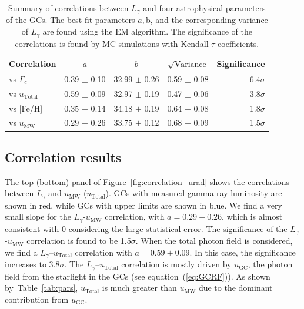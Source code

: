 \documentclass[doublespace,nopageskip]{VTthesis} %
\begin{document}
\begin{table}[htb]
\centering
\caption{Summary of correlations between $L_\gamma$ and four astrophysical parameters of the GCs. The best-fit parameters $a, $b, and the corresponding variance of $L_\gamma$ are found using the EM algorithm. The significance of the correlations is found by MC simulations with Kendall $\tau$ coefficients.}
\label{tab:correlation}
\begin{tabular}{lcccr}
\hline
 Correlation & $a$ & $b$ & $\sqrt{\text{Variance}}$ & Significance\\
\hline
vs $\Gamma_c$ & 0.39 $\pm$ 0.10 & 32.99 $\pm$ 0.26 & 0.59 $\pm$ 0.08 & 6.4$\sigma$\\
vs $u_{\mathrm{Total}}$ & 0.59 $\pm$ 0.09 & 32.97 $\pm$ 0.19 & 0.47 $\pm$ 0.06 & 3.8$\sigma$\\
vs [Fe/H] & 0.35 $\pm$ 0.14 & 34.18 $\pm$ 0.19 & 0.64 $\pm$ 0.08 & 1.8$\sigma$\\
vs $u_\mathrm{MW}$ & 0.29 $\pm$ 0.26 & 33.75 $\pm$ 0.12 & 0.68 $\pm$ 0.09 & 1.5$\sigma$\\
\hline
\end{tabular}
\end{table}

\subsection{Correlation results}

The top (bottom) panel of Figure~\ref{fig:correlation_urad} shows the correlations between $L_\gamma$ and $u_\mathrm{MW}$ ($u_\mathrm{Total}$). GCs with measured gamma-ray luminosity are shown in red, while GCs with upper limits are shown in blue. We find a very small slope for the $L_\gamma$-$u_\mathrm{MW}$ correlation, with $a=0.29 \pm 0.26$, which is almost consistent with 0 considering the large statistical error. The significance of the $L_\gamma$-$u_\mathrm{MW}$ correlation is found to be 1.5$\sigma$. When the total photon field is considered, we find a $L_\gamma$--$u_\mathrm{Total}$ correlation with $a = 0.59 \pm 0.09$. In this case, the significance increases to 3.8$\sigma$. The $L_\gamma$--$u_\mathrm{Total}$ correlation is mostly driven by $u_\mathrm{GC}$, the photon field from the starlight in the GCs (see equation~(\ref{eq:GCRF})). As shown by~Table~\ref{tab:pars}, $u_\mathrm{Total}$ is much greater than $u_\mathrm{MW}$ due to the dominant contribution from $u_\mathrm{GC}$. 
\end{document}
